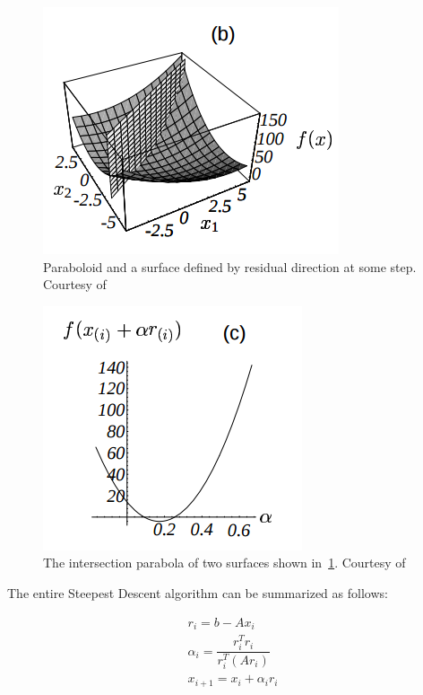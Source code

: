 \documentclass[en]{minipw} %
\begin{document}
\begin{figure}[h!]
\centering
\includegraphics[scale=0.8]{pictures/alpha1.png}
\caption[Paraboloid and surface]{Paraboloid and a surface defined by residual direction at some step. Courtesy of~\cite{cg}}
\label{fig:cg_alpha1}
\end{figure}

\begin{figure}[h!]
\centering
\includegraphics[scale=0.8]{pictures/alpha2.png}
\caption[Intersection of paraboloid and surface]{The intersection parabola of two surfaces shown in~\ref{fig:cg_alpha1}. Courtesy of~\cite{cg}}
\label{fig:cg_alpha2}
\end{figure}

The entire Steepest Descent algorithm can be summarized as follows:

\begin{equation}
\begin{aligned}
r_{i} = b - Ax_{i}
\\
\alpha_{i} = \dfrac{r_{i}^{T}r_{i}}{r_{i}^{T} (Ar_{i})}
\\
x_{i+1} = x_{i} + \alpha_{i}r_{i}
\end{aligned}
\end{equation}
\end{document}
